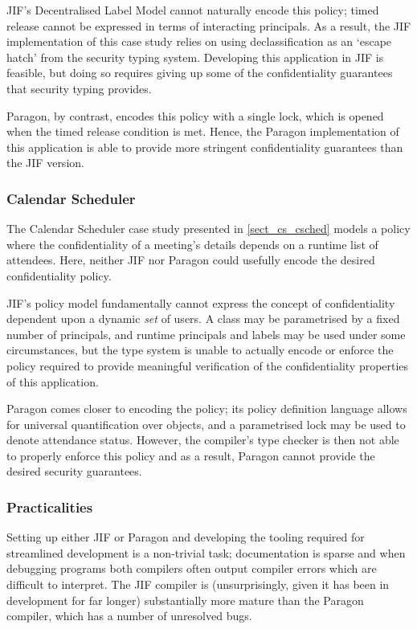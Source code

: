 JIF's Decentralised Label Model cannot naturally encode this policy; timed release cannot be expressed in terms of interacting principals. As a result, the JIF implementation of this case study relies on using declassification as an `escape hatch' from the security typing system. Developing this application in JIF is feasible, but doing so requires giving up some of the confidentiality guarantees that security typing provides.

Paragon, by contrast, encodes this policy with a single lock, which is opened when the timed release condition is met. Hence, the Paragon implementation of this application is able to provide more stringent confidentiality guarantees than the JIF version.

\subsubsection{Calendar Scheduler}

The Calendar Scheduler case study presented in \ref{sect_cs_csched} models a policy where the confidentiality of a meeting's details depends on a runtime list of attendees. Here, neither JIF nor Paragon could usefully encode the desired confidentiality policy.

JIF's policy model fundamentally cannot express the concept of confidentiality dependent upon a dynamic \textit{set} of users. A class may be parametrised by a fixed number of principals, and runtime principals and labels may be used under some circumstances, but the type system is unable to actually encode or enforce the policy required to provide meaningful verification of the confidentiality properties of this application.

Paragon comes closer to encoding the policy; its policy definition language allows for universal quantification over objects, and a parametrised lock may be used to denote attendance status. However, the compiler's type checker is then not able to properly enforce this policy and as a result, Paragon cannot provide the desired security guarantees.

\subsubsection{Practicalities}

Setting up either JIF or Paragon and developing the tooling required for streamlined development is a non-trivial task; documentation is sparse and when debugging programs both compilers often output compiler errors which are difficult to interpret. The JIF compiler is (unsurprisingly, given it has been in development for far longer) substantially more mature than the Paragon compiler, which has a number of unresolved bugs.

